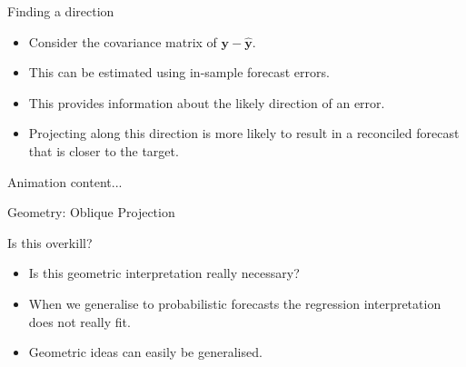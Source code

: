 \documentclass[handout]{beamer}
\begin{document}
  \begin{frame}{Finding a direction}
  \begin{itemize}
  \item Consider the covariance matrix of ${\bm y}-\hat{\bm{y}}$.
   \item This can be estimated using in-sample forecast errors.
  \item This provides information about the likely direction of an error.
  \item Projecting along this direction is more likely to result in a reconciled forecast that is closer to the target.
  \end{itemize}  
\end{frame}
  \begin{frame}{Animation}
  content...
  \end{frame}
  \begin{frame}{Geometry: Oblique Projection}
   	\vspace{-0.9cm}
   	\centering
   	
  \end{frame}
  \begin{frame}{Is this overkill?}
  \begin{itemize}
  	\item Is this geometric interpretation really necessary?
  	\item When we generalise to probabilistic forecasts the regression interpretation does not really fit.
  	\item Geometric ideas can easily be generalised. 
  \end{itemize}
  \end{frame}
\end{document}
